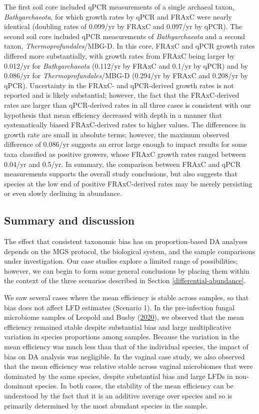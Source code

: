\documentclass[
]{article}
\begin{document}
The first soil core included qPCR measurements of a single archaeal taxon, \emph{Bathyarchaeota}, for which growth rates by qPCR and FRAxC were nearly identical (doubling rates of 0.099/yr by FRAxC and 0.097/yr by qPCR).
The second soil core included qPCR measurements of \emph{Bathyarchaeota} and a second taxon, \emph{Thermoprofundales}/MBG-D.
In this core, FRAxC and qPCR growth rates differed more substantially, with growth rates from FRAxC being larger by 0.012/yr for \emph{Bathyarchaeota} (0.112/yr by FRAxC and 0.1/yr by qPCR) and by 0.086/yr for \emph{Thermoprofundales}/MBG-D (0.294/yr by FRAxC and 0.208/yr by qPCR).
Uncertainty in the FRAxC- and qPCR-derived growth rates is not reported and is likely substantial; however, the fact that the FRAxC-derived rates are larger than qPCR-derived rates in all three cases is consistent with our hypothesis that mean efficiency decreased with depth in a manner that systematically biased FRAxC-derived rates to higher values.
The differences in growth rate are small in absolute terms; however, the maximum observed difference of 0.086/yr suggests an error large enough to impact results for some taxa classified as positive growers, whose FRAxC growth rates ranged between 0.04/yr and 0.5/yr.
In summary, the comparison between FRAxC and qPCR measurements supports the overall study conclusions, but also suggests that species at the low end of positive FRAxC-derived rates may be merely persisting or even slowly declining in abundance.

\hypertarget{summary-and-discussion}{%
\subsection{Summary and discussion}\label{summary-and-discussion}}

The effect that consistent taxonomic bias has on proportion-based DA analyses depends on the MGS protocol, the biological system, and the sample comparisons under investigation.
Our case studies explore a limited range of possibilities; however, we can begin to form some general conclusions by placing them within the context of the three scenarios described in Section \ref{differential-abundance}.

We saw several cases where the mean efficiency is stable across samples, so that bias does not affect LFD estimates (Scenario 1).
In the pre-infection fungal microbiome samples of Leopold and Busby (\protect\hyperlink{ref-leopold2020host}{2020}), we observed that the mean efficiency remained stable despite substantial bias and large multiplicative variation in species proportions among samples.
Because the variation in the mean efficiency was much less than that of the individual species, the impact of bias on DA analysis was negligible.
In the vaginal case study, we also observed that the mean efficiency was relative stable across vaginal microbiomes that were dominated by the same species, despite substantial bias and large LFDs in non-dominant species.
In both cases, the stability of the mean efficiency can be understood by the fact that it is an additive average over species and so is primarily determined by the most abundant species in the sample.
\end{document}
